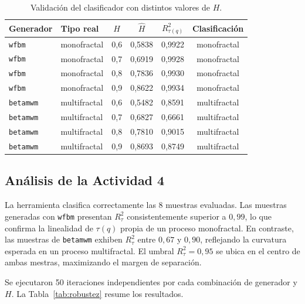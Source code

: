 \begin{table}[H]
\centering
\caption{Validación del clasificador con distintos valores de $H$.}
\label{tab:barrido-h}
\begin{tabular}{llcccc}
    \toprule
    \textbf{Generador} & \textbf{Tipo real} & $H$ & $\hat{H}$ & $R^2_{\tau(q)}$ & \textbf{Clasificación} \\
    \midrule
    \texttt{wfbm}    & monofractal  & 0,6 & 0,5838 & 0,9922 & monofractal  \\
    \texttt{wfbm}    & monofractal  & 0,7 & 0,6919 & 0,9928 & monofractal  \\
    \texttt{wfbm}    & monofractal  & 0,8 & 0,7836 & 0,9930 & monofractal  \\
    \texttt{wfbm}    & monofractal  & 0,9 & 0,8622 & 0,9934 & monofractal  \\
    \midrule
    \texttt{betamwm} & multifractal & 0,6 & 0,5482 & 0,8591 & multifractal \\
    \texttt{betamwm} & multifractal & 0,7 & 0,6827 & 0,6661 & multifractal \\
    \texttt{betamwm} & multifractal & 0,8 & 0,7810 & 0,9015 & multifractal \\
    \texttt{betamwm} & multifractal & 0,9 & 0,8693 & 0,8749 & multifractal \\
    \bottomrule
\end{tabular}
\end{table}

\subsection{Análisis de la Actividad 4}

La herramienta clasifica correctamente las 8 muestras evaluadas. Las muestras
generadas con \texttt{wfbm} presentan $R^2_{\tau}$ consistentemente superior a
$0{,}99$, lo que confirma la linealidad de $\tau(q)$ propia de un proceso
monofractal. En contraste, las muestras de \texttt{betamwm} exhiben
$R^2_{\tau}$ entre $0{,}67$ y $0{,}90$, reflejando la curvatura esperada en un
proceso multifractal. El umbral $R^2_{\tau} = 0{,}95$ se ubica en el centro de ambas mestras, maximizando el margen de separación.

Se ejecutaron 50 iteraciones independientes por cada combinación de generador y
$H$. La Tabla~\ref{tab:robustez} resume los resultados.

